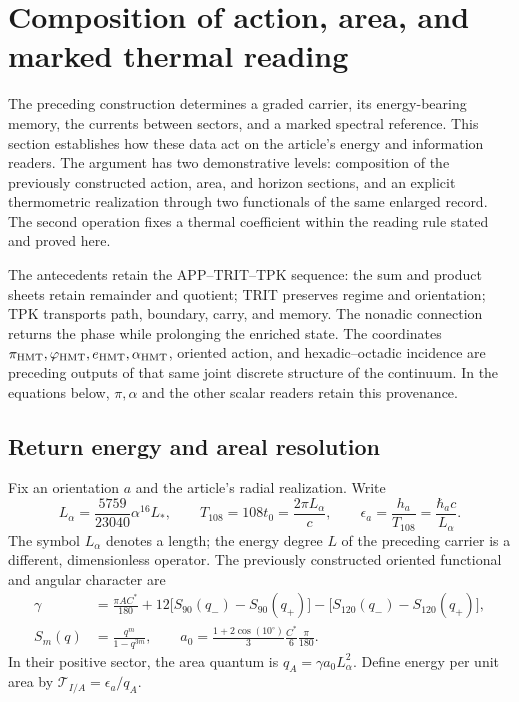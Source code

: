 \section{Composition of action, area, and marked thermal reading}
\label{sec:ii-termica-marcada}

The preceding construction determines a graded carrier, its energy-bearing
memory, the currents between sectors, and a marked spectral reference.
This section establishes how these data act on the article's energy and
information readers. The argument has two demonstrative levels: composition
of the previously constructed action, area, and horizon sections, and an
explicit thermometric realization through two functionals of the same
enlarged record. The second operation fixes a thermal coefficient within
the reading rule stated and proved here.

The antecedents retain the APP--TRIT--TPK sequence: the sum and product
sheets retain remainder and quotient; TRIT preserves regime and orientation;
TPK transports path, boundary, carry, and memory. The nonadic connection
returns the phase while prolonging the enriched state. The coordinates
$\pi_{\mathrm{HMT}},\varphi_{\mathrm{HMT}},e_{\mathrm{HMT}},\alpha_{\mathrm{HMT}}$, oriented action,
and hexadic--octadic incidence are preceding outputs of that same joint
discrete structure of the continuum. In the equations below, $\pi,\alpha$
and the other scalar readers retain this provenance.

\subsection{Return energy and areal resolution}
\label{subsec:ii-termica-accion-area}

Fix an orientation $a$ and the article's radial realization. Write
\begin{equation}
 L_\alpha=\frac{5759}{23040}\alpha^{16}L_* ,\qquad
 T_{108}=108t_0=\frac{2\pi L_\alpha}{c},\qquad
 \epsilon_a=\frac{h_a}{T_{108}}=\frac{\hbar_a c}{L_\alpha}.
 \label{eq:ii-ter27-energia}
\end{equation}
The symbol $L_\alpha$ denotes a length; the energy degree $L$ of the
preceding carrier is a different, dimensionless operator. The previously
constructed oriented functional and angular character are
\begin{align}
 \gamma&=\frac{\pi AC^*}{180}
 +12\bigl[S_{90}(q_-)-S_{90}(q_+)\bigr]
 -\bigl[S_{120}(q_-)-S_{120}(q_+)\bigr],\nonumber\\
 S_m(q)&=\frac{q^m}{1-q^{3m}},\qquad
 a_0=\frac{1+2\cos(10^\circ)}3\frac{C^*}{6}\frac{\pi}{180}.
 \label{eq:ii-ter27-barbero}
\end{align}
In their positive sector, the area quantum is $q_A=\gamma a_0L_\alpha^2$.
Define energy per unit area by $\mathcal T_{I/A}=\epsilon_a/q_A$.

